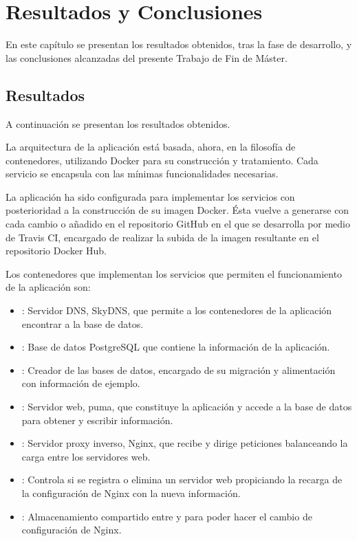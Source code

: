 \chapter{Resultados y Conclusiones}
\label{cha:results}

En este capítulo se presentan los resultados obtenidos, tras la fase de desarrollo, y las conclusiones alcanzadas del presente Trabajo de Fin de Máster.

\section{Resultados}

A continuación se presentan los resultados obtenidos.

La arquitectura de la aplicación está basada, ahora, en la filosofía de contenedores, utilizando Docker para su construcción y tratamiento. Cada servicio se encapsula con las mínimas funcionalidades necesarias.

La aplicación ha sido configurada para implementar los servicios con posterioridad a la construcción de su imagen Docker. Ésta vuelve a generarse con cada cambio o añadido en el repositorio GitHub en el que se desarrolla por medio de Travis CI, encargado de realizar la subida de la imagen resultante en el repositorio Docker Hub.

Los contenedores que implementan los servicios que permiten el funcionamiento de la aplicación son:
\begin{itemize}
\item {}: Servidor DNS, SkyDNS, que permite a los contenedores de la aplicación encontrar a la base de datos.
\item {}: Base de datos PostgreSQL que contiene la información de la aplicación.
\item {}: Creador de las bases de datos, encargado de su migración y alimentación con información de ejemplo.
\item {}: Servidor web, puma, que constituye la aplicación y accede a la base de datos para obtener y escribir información.
\item {}: Servidor proxy inverso, Nginx, que recibe y dirige peticiones balanceando la carga entre los servidores web.
\item {}: Controla si se registra o elimina un servidor web propiciando la recarga de la configuración de Nginx con la nueva información.
\item {}: Almacenamiento compartido entre  y  para poder hacer el cambio de configuración de Nginx.
\end{itemize}

